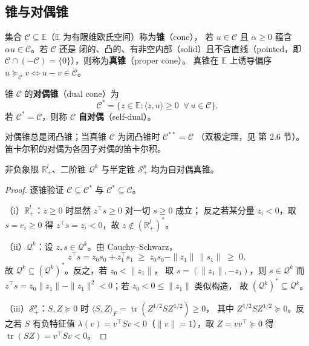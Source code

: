 \subsection{锥与对偶锥}

\begin{definition}[锥与真锥]
集合 $\mathcal{C} \subseteq \mathbb{E}$（$\mathbb{E}$ 为有限维欧氏空间）称为\textbf{锥}（cone），
若 $u \in \mathcal{C}$ 且 $\alpha \ge 0$ 蕴含 $\alpha u \in \mathcal{C}$。若 $\mathcal{C}$ 还是
闭的、凸的、有非空内部（solid）且不含直线（pointed，即
$\mathcal{C} \cap (-\mathcal{C}) = \{0\}$），则称为\textbf{真锥}（proper cone）。
真锥在 $\mathbb{E}$ 上诱导偏序 $u \succeq_{\mathcal{C}} v \iff u - v \in \mathcal{C}$。
\end{definition}

\begin{definition}[对偶锥]
锥 $\mathcal{C}$ 的\textbf{对偶锥}（dual cone）为
\[
\mathcal{C}^* = \{ z \in \mathbb{E} : \langle z, u \rangle \ge 0 \;\; \forall\, u \in \mathcal{C} \}.
\]
若 $\mathcal{C}^* = \mathcal{C}$，则称 $\mathcal{C}$ \textbf{自对偶}（self-dual）。
\end{definition}

对偶锥总是闭凸锥；当真锥 $\mathcal{C}$ 为闭凸锥时 $\mathcal{C}^{**} = \mathcal{C}$
（双极定理，见 \cite{boyd2004} 第 2.6 节）。笛卡尔积的对偶为各因子对偶的笛卡尔积。

\begin{proposition}[三类锥的自对偶性]
\label{prop:conic-self-dual}
非负象限 $\mathbb{R}^l_+$、二阶锥 $\mathcal{Q}^k$ 与半定锥 $\mathcal{S}^p_+$ 均为自对偶真锥。
\end{proposition}
\begin{proof}
逐锥验证 $\mathcal{C} \subseteq \mathcal{C}^*$ 与 $\mathcal{C}^* \subseteq \mathcal{C}$。

（i）$\mathbb{R}^l_+$：$z \ge 0$ 时显然 $z^\top s \ge 0$ 对一切 $s \ge 0$ 成立；
反之若某分量 $z_i < 0$，取 $s = e_i \ge 0$ 得 $z^\top s = z_i < 0$，故 $z \notin (\mathbb{R}^l_+)^*$。

（ii）$\mathcal{Q}^k$：设 $z, s \in \mathcal{Q}^k$。由 Cauchy--Schwarz，
\[
z^\top s = z_0 s_0 + z_1^\top s_1 \;\ge\; z_0 s_0 - \|z_1\|\,\|s_1\| \;\ge\; 0,
\]
故 $\mathcal{Q}^k \subseteq (\mathcal{Q}^k)^*$。反之，若 $z_0 < \|z_1\|$，
取 $s = (\|z_1\|, -z_1)$，则 $s \in \mathcal{Q}^k$ 而
$z^\top s = z_0 \|z_1\| - \|z_1\|^2 < 0$；若 $z_0 < 0 \le \|z_1\|$ 类似构造，
故 $(\mathcal{Q}^k)^* \subseteq \mathcal{Q}^k$。

（iii）$\mathcal{S}^p_+$：$S, Z \succeq 0$ 时
$\langle S, Z \rangle_F = \operatorname{tr}(Z^{1/2} S Z^{1/2}) \ge 0$，
其中 $Z^{1/2} S Z^{1/2} \succeq 0$。反之若 $S$ 有负特征值
$\lambda(v) = v^\top S v < 0$（$\|v\| = 1$），取 $Z = vv^\top \succeq 0$
得 $\operatorname{tr}(SZ) = v^\top S v < 0$。
\end{proof}

